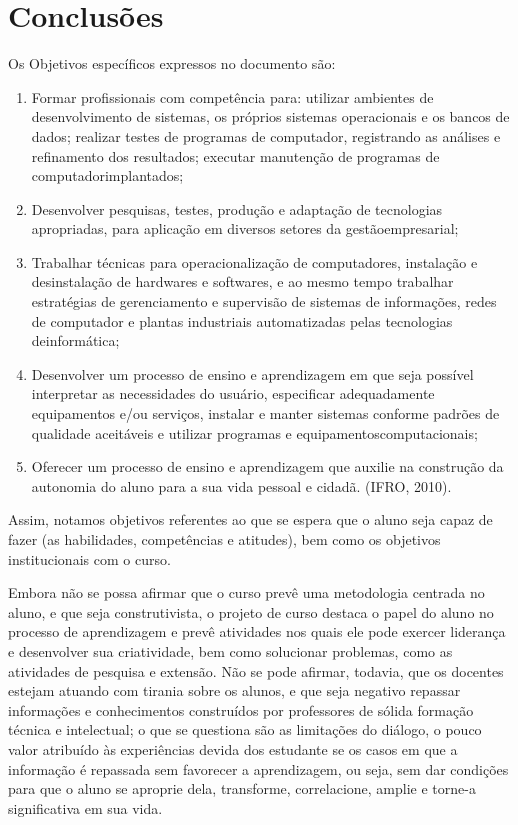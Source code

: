 \documentclass[article,12pt,onesidea,4paper,english,brazil]{abntex2}
\begin{document}
	\section*{Conclusões}
	
Os Objetivos específicos expressos no documento são:
	\begin{enumerate}[label=(\alph*)]
		\item Formar profissionais com competência para: utilizar ambientes de desenvolvimento de sistemas, os próprios sistemas operacionais e os bancos de dados; realizar testes de programas de computador, registrando as análises e refinamento dos resultados; executar manutenção de programas de computadorimplantados;
		
		\item Desenvolver pesquisas, testes, produção e adaptação de tecnologias apropriadas, para aplicação em diversos setores da gestãoempresarial;
		
		\item Trabalhar técnicas para operacionalização de computadores, instalação e desinstalação de hardwares e softwares, e ao mesmo tempo trabalhar estratégias de gerenciamento e supervisão de sistemas de informações, redes de computador e plantas industriais automatizadas pelas tecnologias deinformática;
		
		\item Desenvolver um processo de ensino e aprendizagem em que seja possível interpretar as necessidades do usuário, especificar  adequadamente equipamentos e/ou serviços, instalar e manter sistemas conforme padrões de qualidade aceitáveis e utilizar programas e equipamentoscomputacionais;
		
		\item Oferecer um processo de ensino e aprendizagem que auxilie na construção da autonomia do aluno para a sua vida pessoal e cidadã. (IFRO, 2010).
	\end{enumerate}

Assim, notamos objetivos referentes ao que se espera que o aluno seja capaz de fazer (as habilidades, competências e atitudes), bem como os objetivos institucionais com o curso.

Embora não se possa afirmar que o curso prevê uma metodologia centrada no aluno, e que seja construtivista, o projeto de curso destaca o papel do aluno no processo de aprendizagem e prevê atividades nos quais ele pode exercer liderança e desenvolver sua criatividade, bem como solucionar problemas, como as atividades de pesquisa e extensão. Não se pode afirmar, todavia, que os docentes estejam atuando com tirania sobre os alunos, e que seja negativo repassar informações e conhecimentos construídos por professores de sólida formação técnica e intelectual; o que se questiona são as limitações do diálogo, o pouco valor atribuído às experiências devida dos estudante se os casos em que a informação é repassada sem favorecer a aprendizagem, ou seja, sem dar condições para que o aluno se aproprie dela, transforme, correlacione, amplie e torne-a significativa em sua vida.
\end{document}
